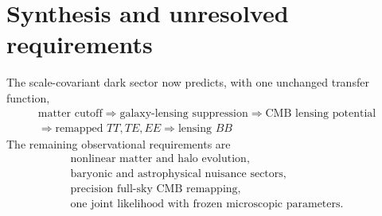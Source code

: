 \section{Synthesis and unresolved requirements}

The scale-covariant dark sector now predicts, with one unchanged transfer function,
\begin{equation}
 \boxed{
 \begin{gathered}
 \text{matter cutoff}
 \Longrightarrow
 \text{galaxy-lensing suppression}
 \Longrightarrow
 \text{CMB lensing potential}\\
 \Longrightarrow
 \text{remapped }TT,TE,EE
 \Longrightarrow
 \text{lensing }BB
 \end{gathered}
 }
 \label{eq:lens-result-chain}
\end{equation}
The remaining observational requirements are
\begin{equation}
 \boxed{
 \begin{gathered}
 \text{nonlinear matter and halo evolution},\\
 \text{baryonic and astrophysical nuisance sectors},\\
 \text{precision full-sky CMB remapping},\\
 \text{one joint likelihood with frozen microscopic parameters}.
 \end{gathered}
 }
 \label{eq:lens-open-requirements}
\end{equation}
